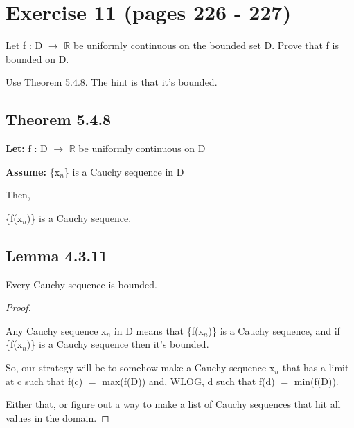 \documentclass{article}
\newcommand{\mt}[1]{\ensuremath{#1}}
\newcommand\bsc[2][\DefaultOpt]{%
  \def\DefaultOpt{#2}%
  \section[#1]{#2}%
}
\newcommand\ssc[2][\DefaultOpt]{%
  \def\DefaultOpt{#2}%
  \subsection[#1]{#2}%
}
\newcommand{\bgpf}{\begin{proof} $ $\newline}
\newcommand{\lt}[1]{\textbf{Let: } #1}
\newcommand{\as}[1]{\textbf{Assume: } #1}
\newcommand{\epf}{\end{proof}}
\newcommand{\br}{\mt{\mathbb{R}} }       %
\newcommand{\lra}{ \mt{\longrightarrow} } %
\newcommand{\bk}[1]{\{#1\}}
\newcommand{\eql}{\mt{=} }
\newcommand{\uw}[2]{#1\mt{_{#2}}}
\begin{document}
\newpage

\bsc{Exercise 11 (pages 226 - 227)}{

Let f : D \lra \br be uniformly continuous on the bounded set D. Prove that f is bounded on D. 

Use Theorem 5.4.8. The hint is that it's bounded.

\ssc{Theorem 5.4.8}{

\lt{f : D \lra \br be uniformly continuous on D}

\as{\bk{\uw{x}{n}} is a Cauchy sequence in D}

Then,

\bk{f(\uw{x}{n})} is a Cauchy sequence.
}

\ssc{Lemma 4.3.11}{
Every Cauchy sequence is bounded.
}

\bgpf

Any Cauchy sequence \uw{x}{n} in D means that \bk{f(\uw{x}{n})} is a Cauchy sequence, and if \bk{f(\uw{x}{n})} is a Cauchy sequence then it's bounded.

So, our strategy will be to somehow make a Cauchy sequence \uw{x}{n} that has a limit at c such that f(c) \eql max(f(D)) and, WLOG, d such that f(d) \eql min(f(D)).

Either that, or figure out a way to make a list of Cauchy sequences that hit all values in the domain.

\epf


}
\end{document}
